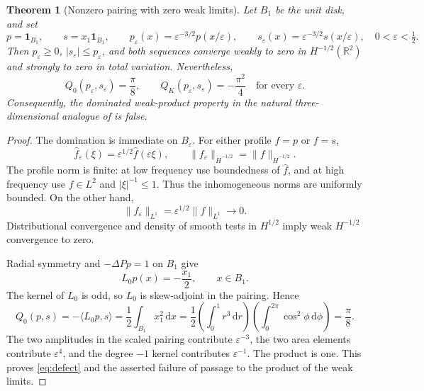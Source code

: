 \documentclass[11pt,a4paper]{article}
\newtheorem{theorem}{Theorem}[section]
\theoremstyle{definition}\newtheorem{definition}[theorem]{Definition}
\theoremstyle{remark}\newtheorem{remark}[theorem]{Remark}
\newcommand{\R}{\mathbb R}
\newcommand{\dd}{\,\mathrm d}
\newcommand{\ip}[2]{\langle #1,#2\rangle}
\newcommand{\norm}[1]{\lVert #1\rVert}
\newcommand{\ind}{\mathbf 1}
\newcommand{\Hdot}{\dot H^{-1/2}}
\numberwithin{equation}{section}
\begin{document}
\begin{theorem}[Nonzero pairing with zero weak limits]\label{thm:bubble}
Let $B_1$ be the unit disk, and set
\begin{equation}\label{eq:bubble}
 p=\ind_{B_1},\qquad s=x_1\ind_{B_1},\qquad
 p_\varepsilon(x)=\varepsilon^{-3/2}p(x/\varepsilon),\qquad
 s_\varepsilon(x)=\varepsilon^{-3/2}s(x/\varepsilon),
 \quad 0<\varepsilon<\tfrac12.
\end{equation}
Then $p_\varepsilon\ge0$, $|s_\varepsilon|\le p_\varepsilon$, and both sequences converge weakly to zero in $H^{-1/2}(\R^2)$ and strongly to zero in total variation. Nevertheless,
\begin{equation}\label{eq:defect}
 Q_0(p_\varepsilon,s_\varepsilon)=\frac\pi8,
 \qquad
 Q_K(p_\varepsilon,s_\varepsilon)=-\frac{\pi^2}{4}
 \quad\text{for every }\varepsilon.
\end{equation}
Consequently, the dominated weak-product property in the natural three-dimensional analogue of \cite[Remark 2.19]{BI} is false.
\end{theorem}
\begin{proof}
The domination is immediate on $B_\varepsilon$. For either profile $f=p$ or $f=s$,
\[
 \widehat f_\varepsilon(\xi)=\varepsilon^{1/2}\widehat f(\varepsilon\xi),
 \qquad \norm{f_\varepsilon}_{\Hdot}=\norm f_{\Hdot}.
\]
The profile norm is finite: at low frequency use boundedness of $\widehat f$, and at high frequency use $f\in L^2$ and $|\xi|^{-1}\le1$. Thus the inhomogeneous norms are uniformly bounded. On the other hand,
\[
 \norm{f_\varepsilon}_{L^1}=\varepsilon^{1/2}\norm f_{L^1}\longrightarrow0.
\]
Distributional convergence and density of smooth tests in $H^{1/2}$ imply weak $H^{-1/2}$ convergence to zero.

Radial symmetry and $-\Delta Pp=1$ on $B_1$ give
\[
 L_0p(x)=-\frac{x_1}{2},\qquad x\in B_1.
\]
The kernel of $L_0$ is odd, so $L_0$ is skew-adjoint in the pairing. Hence
\[
 Q_0(p,s)=-\ip{L_0p}{s}
 =\frac12\int_{B_1}x_1^2\dd x
 =\frac12\left(\int_0^1r^3\dd r\right)
             \left(\int_0^{2\pi}\cos^2\phi\dd\phi\right)=\frac\pi8.
\]
The two amplitudes in the scaled pairing contribute $\varepsilon^{-3}$, the two area elements contribute $\varepsilon^4$, and the degree $-1$ kernel contributes $\varepsilon^{-1}$. The product is one. This proves \eqref{eq:defect} and the asserted failure of passage to the product of the weak limits.
\end{proof}
\end{document}
